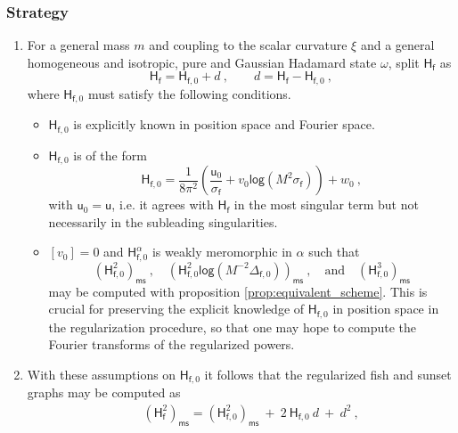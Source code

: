 \documentclass[11pt]{book}
\newcommand{\ms}{\mathsf{ms}}
\renewcommand{\log}{\mathsf{log}}
\newcommand{\Hsf}{\mathsf{H}}
\newcommand{\fsf}{\mathsf{f}}
\newcommand{\usf}{\mathsf{u}}
\theoremstyle{break}
\begin{document}
\subsubsection{Strategy}


\begin{enumerate}
%
%
\item For a general mass $m$ and coupling to the scalar curvature $\xi$ and a general homogeneous and isotropic, pure and Gaussian Hadamard state $\omega$, split $\Hsf_\fsf$ as
%
\begin{equation}
\Hsf_\fsf = \Hsf_{\fsf,0} + d \ , \qquad d = \Hsf_\fsf - \Hsf_{\fsf,0} \ ,
\label{eq:propagator_split}
\end{equation}
%
where $\Hsf_{\fsf,0}$ must satisfy the following conditions.
%
\begin{itemize}
%
\item $\Hsf_{\fsf,0}$ is explicitly known in position space and Fourier space.
%
\item $\Hsf_{\fsf,0}$ is of the form
%
\begin{equation*}
\Hsf_{\fsf,0} = \frac{1}{8\pi^2} \left( \frac{\usf_0}{\sigma_\fsf} + v_0 \log\left(M^2\sigma_\fsf\right) \right) + w_0 \ , 
\end{equation*}
%
with $\usf_0=\usf$, i.e. it agrees with $\Hsf_\fsf$ in the most singular term but not necessarily in the subleading singularities.
%
\item $[v_0]=0$ and $\Hsf^{\alpha}_{\fsf,0}$ is weakly meromorphic in $\alpha$ such that
%
\begin{equation*}
\left(\Hsf^2_{\fsf,0}\right)_\ms \ , \quad 
\left(\Hsf^2_{\fsf,0} \log\left(M^{-2} \Delta_{\fsf,0}\right) \right)_\ms \ , \quad
\mbox{and} \quad \left(\Hsf^3_{\fsf,0}\right)_\ms 
\end{equation*}
%
may be computed with proposition \ref{prop:equivalent_scheme}. This is crucial for preserving the explicit knowledge of $\Hsf_{\fsf,0}$ in position space in the regularization procedure, so that one may hope to compute the Fourier transforms of the regularized powers.
%
\end{itemize}
%
%
\item With these assumptions on $\Hsf_{\fsf,0}$ it follows that the regularized fish and sunset graphs may be computed as
%
\begin{eqnarray}
&& (\Hsf_\fsf^2)_\ms = (\Hsf_{\fsf,0}^2)_\ms \ + \ 2 \ \Hsf_{\fsf,0} \ d \ + \ d^2 \ , \nonumber \\

\end{eqnarray}
\end{enumerate}
\end{document}
